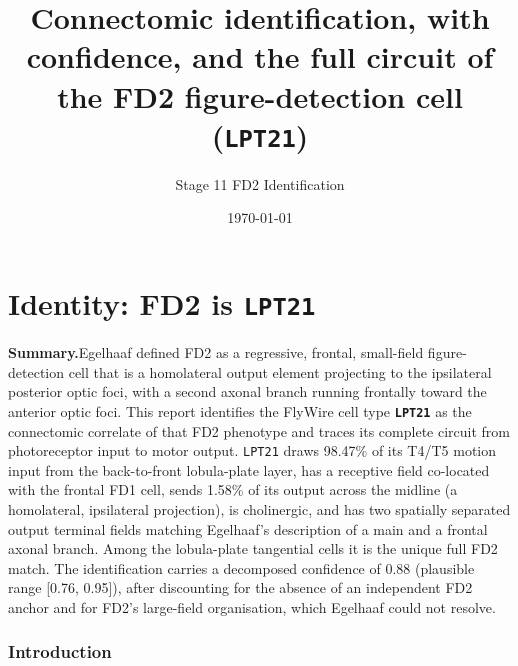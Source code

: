 \documentclass[11pt]{article}
\newcommand{\ttt}[1]{\texttt{#1}}
\begin{document}
\title{\textbf{Connectomic identification, with confidence, and the full circuit of the FD2 figure-detection cell (\ttt{LPT21})}}

\author{Stage 11 FD2 Identification}

\date{\today}

\maketitle

\tableofcontents

\part{Identity: FD2 is \texttt{LPT21}}

\textbf{Summary.}\quad Egelhaaf defined FD2 as a regressive, frontal, small-field figure-detection cell that is a homolateral output element projecting to the ipsilateral posterior optic foci, with a second axonal branch running frontally toward the anterior optic foci. This report identifies the FlyWire cell type \textbf{\ttt{LPT21}} as the connectomic correlate of that FD2 phenotype and traces its complete circuit from photoreceptor input to motor output. \ttt{LPT21} draws 98.47\% of its T4/T5 motion input from the back-to-front lobula-plate layer, has a receptive field co-located with the frontal FD1 cell, sends 1.58\% of its output across the midline (a homolateral, ipsilateral projection), is cholinergic, and has two spatially separated output terminal fields matching Egelhaaf's description of a main and a frontal axonal branch. Among the lobula-plate tangential cells it is the unique full FD2 match. The identification carries a decomposed confidence of 0.88 (plausible range [0.76, 0.95]), after discounting for the absence of an independent FD2 anchor and for FD2's large-field organisation, which Egelhaaf could not resolve.

\section{Introduction}
\end{document}
